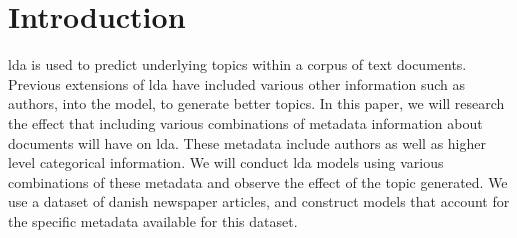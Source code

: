 \section{Introduction}\label{sec:intro}
\Gls{lda} is used to predict underlying topics within a corpus of text documents.
Previous extensions of \gls{lda} have included various other information such as authors, into the model, to generate better topics.
In this paper, we will research the effect that including various combinations of metadata information about documents will have on \gls{lda}.
These metadata include authors as well as higher level categorical information.
We will conduct \gls{lda} models using various combinations of these metadata and observe the effect of the topic generated.
We use a dataset of danish newspaper articles, and construct models that account for the specific metadata available for this dataset.